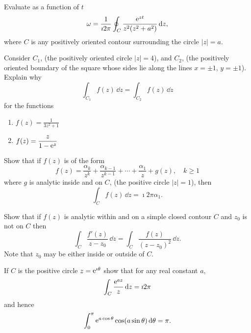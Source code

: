 {%
\begin{Exercise}
  Evaluate as a function of $t$
  \[
  \omega = \frac{1}{\imath 2 \pi} \oint_C \frac{\mathop{\mathrm{e}}\nolimits^{z t}}{z^2 (z^2 + a^2)}\,\mathrm{d} z,
  \]
  where $C$ is any positively oriented contour surrounding the circle 
  $|z| = a$.
\end{Exercise}




\begin{Exercise}
  Consider $C_1$, (the positively oriented circle $|z| = 4$), and $C_2$,
  (the positively oriented boundary of the square whose sides lie along the 
  lines $x = \pm 1$, $y = \pm 1$).  Explain why
  \[
  \int_{C_1} f(z) \,\dd z = \int_{C_2} f(z) \,\dd z
  \]
  for the functions
  \begin{enumerate}
  \item 
    $\displaystyle f(z) = \frac{1}{3 z^2 + 1}$
  \item 
    $\displaystyle f(z) = \frac{z}{1 - \mathop{\mathrm{e}}\nolimits^z}$
  \end{enumerate}
\end{Exercise}









\begin{Exercise}
  Show that if $f(z)$ is of the form
  \[
  f(z) = \frac{\alpha_k}{z^k} + \frac{\alpha_{k-1}}{z^{k-1}} + \cdots +\frac{\alpha_1}{z} + g(z), \quad k \geq 1
  \]
  where $g$ is analytic inside and on $C$, (the positive circle $|z| = 1$), then
  \[
  \int_C f(z)\,\dd z = \imath 2 \pi \alpha_1.
  \]  
\end{Exercise}







\begin{Exercise}
  Show that if $f(z)$ is analytic within and on a simple closed contour $C$ and
  $z_0$ is not on $C$ then
  \[
  \int_C \frac{f'(z)}{z - z_0}\,\dd z = \int_C \frac{f(z)}{(z - z_0)^2}\,\dd z.
  \]
  Note that $z_0$ may be either inside or outside of $C$.
\end{Exercise}








\begin{Exercise}
  If $C$ is the positive circle $z = \mathop{\mathrm{e}}\nolimits^{\imath \theta}$ show that for any real constant $a$,
  \[
  \int_C \frac{\mathop{\mathrm{e}}\nolimits^{a z}}{z} \,\mathrm{d} z = \imath 2 \pi
  \]
  and hence
  \[
  \int_0^\pi \mathop{\mathrm{e}}\nolimits^{a \cos \theta} \cos(a \sin \theta)\,\mathrm{d} \theta = \pi.
  \]
\end{Exercise}









}

